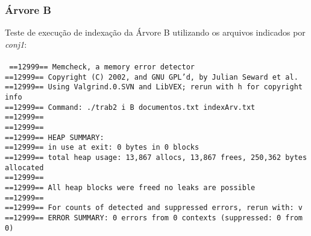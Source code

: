 \documentclass[
	11pt,				%
	oneside,			%
	a4paper,			%
	english,			%
	brazil,				%
	]{article}
\begin{document}
\subsubsection{Árvore B}
Teste de execução de indexação da Árvore B utilizando os arquivos indicados por \textit{conj1}:
\\\\
\texttt{
==12999== Memcheck, a memory error detector \\
==12999== Copyright (C) 2002, and GNU GPL'd, by Julian Seward et al. \\
==12999== Using Valgrind.0.SVN and LibVEX; rerun with \-h for copyright info \\
==12999== Command: ./trab2 \-i B documentos.txt indexArv.txt \\
==12999==  \\
==12999==  \\
==12999== HEAP SUMMARY: \\
==12999==     in use at exit: 0 bytes in 0 blocks \\
==12999==   total heap usage: 13,867 allocs, 13,867 frees, 250,362 bytes allocated \\
==12999==  \\
==12999== All heap blocks were freed \-\- no leaks are possible \\
==12999==  \\
==12999== For counts of detected and suppressed errors, rerun with: \-v \\
==12999== ERROR SUMMARY: 0 errors from 0 contexts (suppressed: 0 from 0) \\
}
\end{document}
